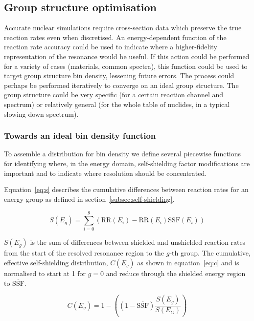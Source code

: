 \subsection{Group structure optimisation}
\label{subsec:opt}
Accurate nuclear simulations require cross-section data which preserve the true reaction rates even when discretised. An energy-dependent function of the reaction rate accuracy could be used to indicate where a higher-fidelity representation of the resonance would be useful. If this action could be performed for a variety of cases (materials, common spectra), this function could be used to target group structure bin density, lessening future errors. The process could perhaps be performed iteratively to converge on an ideal group structure. The group structure could be very specific (for a certain reaction channel and spectrum) or relatively general (for the whole table of nuclides, in a typical slowing down spectrum).

\subsubsection{Towards an ideal bin density function}
To assemble a distribution for bin density we define several piecewise functions for identifying where, in the energy domain, self-shielding factor modifications are important and to indicate where resolution should be concentrated. 

Equation~\ref{eq:s} describes the cumulative differences between reaction rates for an energy group as defined in section~\ref{subsec:self-shielding}. 

\begin{equation}
  \label{eq:s}
  S(E_{g}) = \sum_{i=0}^{g} (\mathrm{RR}(E_{i}) - \mathrm{RR}(E_{i})\mathrm{SSF}(E_{i}))
\end{equation}

$S(E_{g})$ is the sum of differences between shielded and unshielded reaction rates from the start of the resolved resonance region to the $g$-th group. The cumulative, effective self-shielding distribution, $C(E_{g})$ as shown in equation~\ref{eq:c} and is normalised to start at 1 for $g=0$ and reduce through the shielded energy region to $\overline{\mathrm{SSF}}$.

\begin{equation}
  \label{eq:c}
  C(E_{g}) = 1 - \left( \left(1-\overline{\mathrm{SSF}}\right) \frac{S(E_{g})} {S(E_{G})}\right)
\end{equation}

